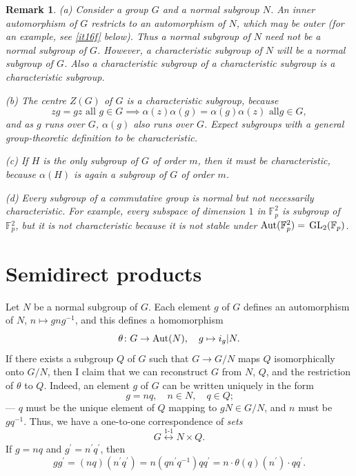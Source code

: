 \documentclass[a4paper,11pt,final,openany]{memoir}%
\newtheorem{remark}[X]{Remark}
\theoremstyle{nonumberplain}
\begin{document}
\begin{remark}
\label{it12} (a) Consider a group $G$ and a normal subgroup $N$. An inner
automorphism of $G$ restricts to an automorphism of $N$, which may be outer
(for an example, see \ref{it16f} below). Thus a normal subgroup of $N$ need
not be a normal subgroup of $G$. However, a characteristic subgroup of $N$
will be a normal subgroup of $G$. Also a characteristic subgroup of a
characteristic subgroup is a characteristic subgroup.

(b) The centre $Z(G)$ of $G$ is a characteristic subgroup, because
\[
zg=gz\text{ all }g\in G\implies\alpha(z)\alpha(g)=\alpha(g)\alpha(z)\text{ all
}g\in G,
\]
and as $g$ runs over $G$, $\alpha(g)$ also runs over $G$. Expect subgroups
with a general group-theoretic definition to be characteristic.

(c) If $H$ is the only subgroup of $G$ of order $m$, then it must be
characteristic, because $\alpha(H)$ is again a subgroup of $G$ of order $m$.

(d) Every subgroup of a commutative group is normal but not necessarily
characteristic. For example, every subspace of dimension $1$ in $\mathbb{F}%
_{p}^{2}$ is subgroup of $\mathbb{F}{}_{p}^{2}$, but it is not characteristic
because it is not stable under $\operatorname{Aut}(\mathbb{F}{}_{p}^{2})=$ $\GL_{2}%
(\mathbb{F}_{p})$.
\end{remark}

\section{Semidirect products}

Let $N$ be a normal subgroup of $G$. Each element $g$ of $G$ defines an
automorphism of $N$, $n\mapsto gng^{-1}$, and this defines a homomorphism
\[
\theta\colon G\rightarrow\operatorname{Aut}(N),\quad g\mapsto i_{g}|N.
\]
If there exists a subgroup $Q$ of $G$ such that $G\rightarrow G/N$ maps $Q$
isomorphically onto $G/N$, then I claim that we can reconstruct $G$ from $N$,
$Q$, and the restriction of $\theta$ to $Q$. Indeed, an element $g$ of $G$ can
be written uniquely in the form%
\[
g=nq,\quad n\in N,\quad q\in Q\text{;}%
\]
--- $q$ must be the unique element of $Q$ mapping to $gN\in G/N$, and $n$ must
be $gq^{-1}$. Thus, we have a one-to-one correspondence of \textit{sets}
\[
G\overset{\text{1-1}}{\longleftrightarrow}N\times Q.
\]
If $g=nq$ and $g^{\prime}=n^{\prime}q^{\prime}$, then
\[
gg^{\prime}=\left(  nq\right)  \left(  n^{\prime}q^{\prime}\right)
=n(qn^{\prime}q^{-1})qq^{\prime}=n\cdot\theta(q)(n^{\prime})\cdot qq^{\prime
}.
\]
\end{document}
